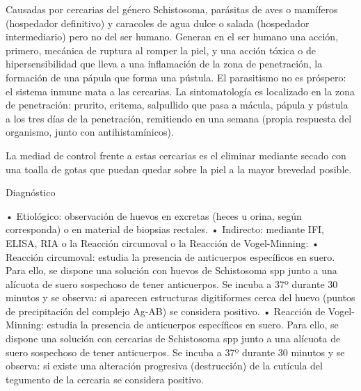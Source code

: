 Causadas por cercarias del género Schistosoma, parásitas de aves o mamíferos (hospedador definitivo) y caracoles de agua dulce o salada (hospedador intermediario) pero no del ser humano.
Generan en el ser humano una acción, primero, mecánica de ruptura al romper la piel, y una acción tóxica o de hipersensibilidad que lleva a una inflamación de la zona de penetración, la formación de una pápula que forma una pústula. El parasitismo no es próspero: el sistema inmune mata a las cercarias. La sintomatología es localizado en la zona de penetración: prurito, eritema, salpullido que pasa a mácula, pápula y pústula a los tres días de la penetración, remitiendo en una semana (propia respuesta del organismo, junto con antihistamínicos).

La mediad de control frente a estas cercarias es el eliminar mediante secado con una toalla de gotas que puedan quedar sobre la piel a la mayor brevedad posible.



Diagnóstico

• Etiológico: observación de huevos en excretas (heces u orina, según corresponda) o en material de biopsias rectales.
• Indirecto: mediante IFI, ELISA, RIA o la Reacción circumoval o la Reacción de Vogel-Minning:
• Reacción circumoval: estudia la presencia de anticuerpos específicos en suero. Para ello, se dispone una solución con huevos de Schistosoma spp junto a una alícuota de suero sospechoso de tener anticuerpos. Se incuba a 37º durante 30 minutos y se observa: si aparecen estructuras digitiformes cerca del huevo (puntos de precipitación del complejo Ag-AB) se considera positivo.
• Reacción de Vogel-Minning: estudia la presencia de anticuerpos específicos en suero. Para ello, se dispone una solución con cercarias de Schistosoma spp junto a una alícuota de suero sospechoso de tener anticuerpos. Se incuba a 37º durante 30 minutos y se observa: si existe una alteración progresiva (destrucción) de la cutícula del tegumento de la cercaria se considera positivo.

